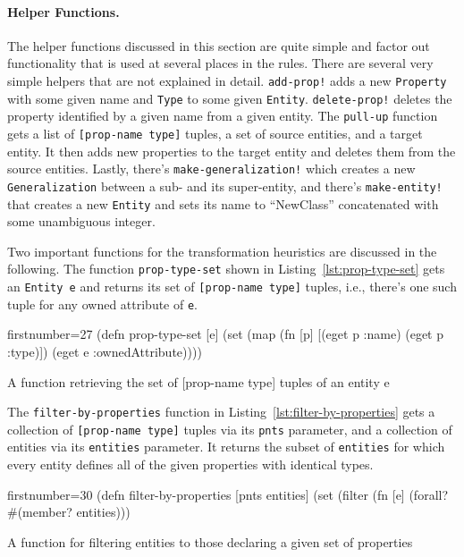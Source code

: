 \documentclass[submission]{eptcs}
\begin{document}
\paragraph{Helper Functions.}

The helper functions discussed in this section are quite simple and factor out
functionality that is used at several places in the rules.  There are several
very simple helpers that are not explained in detail.  \verb|add-prop!| adds a
new \verb|Property| with some given name and \verb|Type| to some given
\verb|Entity|.  \verb|delete-prop!| deletes the property identified by a given
name from a given entity.  The \verb|pull-up| function gets a list of
\verb|[prop-name type]| tuples, a set of source entities, and a target entity.
It then adds new properties to the target entity and deletes them from the
source entities.  Lastly, there's \verb|make-generalization!| which creates a
new \verb|Generalization| between a sub- and its super-entity, and there's
\verb|make-entity!| that creates a new \verb|Entity| and sets its name to
``NewClass'' concatenated with some unambiguous integer.

Two important functions for the transformation heuristics are discussed in the
following.  The function \verb|prop-type-set| shown in
Listing~\ref{lst:prop-type-set} gets an \verb|Entity e| and returns its set of
\verb|[prop-name type]| tuples, i.e., there's one such tuple for any owned
attribute of \verb|e|.

\begin{listing}[h!tbp]
  \begin{clojurecode*}{firstnumber=27}
(defn prop-type-set [e]
  (set (map (fn [p] [(eget p :name) (eget p :type)])
            (eget e :ownedAttribute))))
  \end{clojurecode*}
  \caption{A function retrieving the set of \textsf{[prop-name type]} tuples
    of an entity \textsf{e}}
    \label{lst:prop-type-set}
\end{listing}

The \verb|filter-by-properties| function in
Listing~\ref{lst:filter-by-properties} gets a collection of
\verb|[prop-name type]| tuples via its \verb|pnts| parameter, and a collection
of entities via its \verb|entities| parameter.  It returns the subset of
\verb|entities| for which every entity defines all of the given properties with
identical types.

\begin{listing}[htbp]
  \begin{clojurecode*}{firstnumber=30}
(defn filter-by-properties [pnts entities]
  (set (filter (fn [e] (forall? #(member? %
               entities)))
  \end{clojurecode*}
  \caption{A function for filtering entities to those declaring a given set of
    properties}
  \label{lst:filter-by-properties}
\end{listing}
\end{document}
